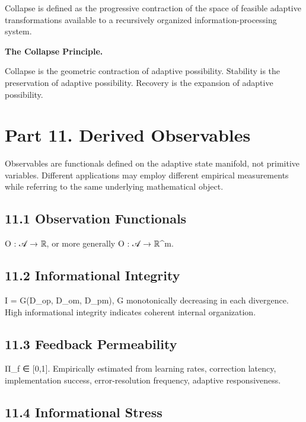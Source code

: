 \documentclass[
]{article}
\begin{document}
Collapse is defined as the progressive contraction of the space of
feasible adaptive transformations available to a recursively organized
information-processing system.

\textbf{The Collapse Principle.}

Collapse is the geometric contraction of adaptive possibility. Stability
is the preservation of adaptive possibility. Recovery is the expansion
of adaptive possibility.

\hypertarget{part-11.-derived-observables}{%
\section{Part 11. Derived
Observables}\label{part-11.-derived-observables}}

Observables are functionals defined on the adaptive state manifold, not
primitive variables. Different applications may employ different
empirical measurements while referring to the same underlying
mathematical object.

\hypertarget{observation-functionals}{%
\subsection{11.1 Observation
Functionals}\label{observation-functionals}}

O : 𝒜 → ℝ, or more generally O : 𝒜 → ℝ\^{}m.

\hypertarget{informational-integrity-1}{%
\subsection{11.2 Informational
Integrity}\label{informational-integrity-1}}

I = G(D\_op, D\_om, D\_pm), G monotonically decreasing in each
divergence. High informational integrity indicates coherent internal
organization.

\hypertarget{feedback-permeability-1}{%
\subsection{11.3 Feedback Permeability}\label{feedback-permeability-1}}

Π\_f ∈ {[}0,1{]}. Empirically estimated from learning rates, correction
latency, implementation success, error-resolution frequency, adaptive
responsiveness.

\hypertarget{informational-stress-1}{%
\subsection{11.4 Informational Stress}\label{informational-stress-1}}
\end{document}
